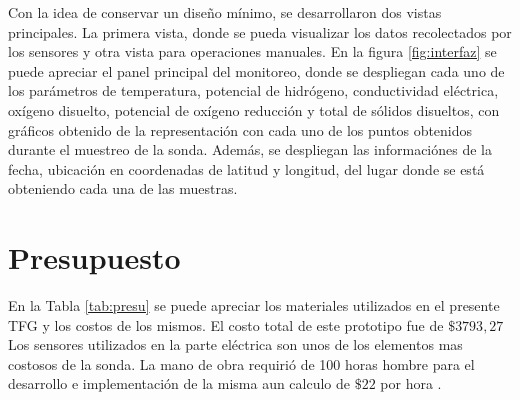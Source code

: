 Con la idea de conservar un dise\~no m\'inimo, se desarrollaron dos vistas principales. 
La primera vista, donde se pueda visualizar los datos recolectados por los sensores y otra vista para operaciones manuales. 
En la figura \ref{fig:interfaz} se puede apreciar el panel principal del monitoreo, donde se despliegan cada uno de los parámetros de temperatura, potencial de hidrógeno, conductividad eléctrica, ox\'igeno disuelto, potencial de ox\'igeno reducción y total de s\'olidos disueltos, con gráficos obtenido de la representaci\'on  con cada uno de los puntos obtenidos durante el muestreo de la sonda. 
Además, se despliegan las informaci\'ones de la fecha, ubicación en coordenadas de latitud y longitud, del lugar donde se est\'a obteniendo cada una de las muestras.

\section[Presupuesto]{Presupuesto}
En la Tabla \ref{tab:presu} se puede apreciar los materiales utilizados en el presente TFG y los costos de los mismos. 
El costo total de este prototipo fue de $\$ 3793,27$
Los sensores utilizados en la parte eléctrica son unos de los elementos mas costosos de la sonda.
La mano de obra requirió de 100 horas hombre para el desarrollo e implementación de la misma aun calculo de $\$22$ por hora .   
